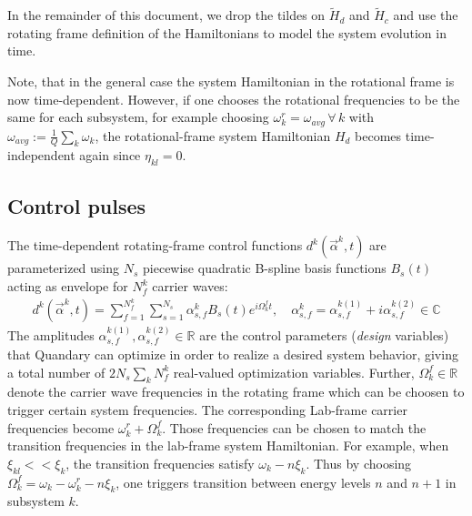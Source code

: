 \documentclass[11pt]{article}
\newcommand{\R}{\mathds{R}}
\newcommand{\C}{\mathds{C}}
\begin{document}
In the remainder of this document, we drop the tildes on $\tilde H_d$ and $\tilde H_c$ and use the rotating frame definition of the Hamiltonians to model the system evolution in time. 

Note, that in the general case the system Hamiltonian in the rotational frame is now time-dependent. However, if one chooses the rotational frequencies to be the same for each subsystem, for example choosing $\omega_k^{r} = \omega_{avg} \, \forall \, k$ with $\omega_{avg} := \frac 1Q \sum_k \omega_k$, the rotational-frame system Hamiltonian $H_d$ becomes time-independent again since $\eta_{kl} = 0$. 

\subsection{Control pulses} \label{subsec:controlpulses}
The time-dependent rotating-frame control functions $d^k(\vec{\alpha}^k,t)$ are parameterized using $N_s$ piecewise quadratic B-spline basis functions $B_s(t)$ acting as envelope for $N_f^k$ carrier waves:
\begin{align}
  d^k(\vec{\alpha}^k,t) = \sum_{f=1}^{N_f^k} \sum_{s=1}^{N_s} \alpha_{s,f}^k B_s(t) e^{i\Omega_k^ft}, \quad \alpha_{s,f}^k = \alpha_{s,f}^{k(1)} + i \alpha_{s,f}^{k(2)} \in \C
\end{align}
The amplitudes $\alpha_{s,f}^{k(1)}, \alpha_{s,f}^{k(2)} \in \R$ are the control
parameters (\textit{design} variables) that Quandary can optimize in order to realize a
desired system behavior, giving a total number of $2N_s\sum_kN_f^k$ real-valued optimization variables. Further, $\Omega_k^f \in \R$ denote the carrier wave frequencies in the rotating frame which can be choosen to trigger certain system frequencies. The corresponding Lab-frame carrier frequencies become $\omega_k^r + \Omega_k^f$. Those frequencies can be chosen to match the transition frequencies in the lab-frame system Hamiltonian. For example, when $\xi_{kl} << \xi_k$, the transition frequencies satisfy $\omega_k - n\xi_k$. Thus by choosing $\Omega_k^f = \omega_k-\omega_k^r - n \xi_k$, one triggers transition between energy levels $n$ and $n+1$ in subsystem $k$. 
\end{document}
